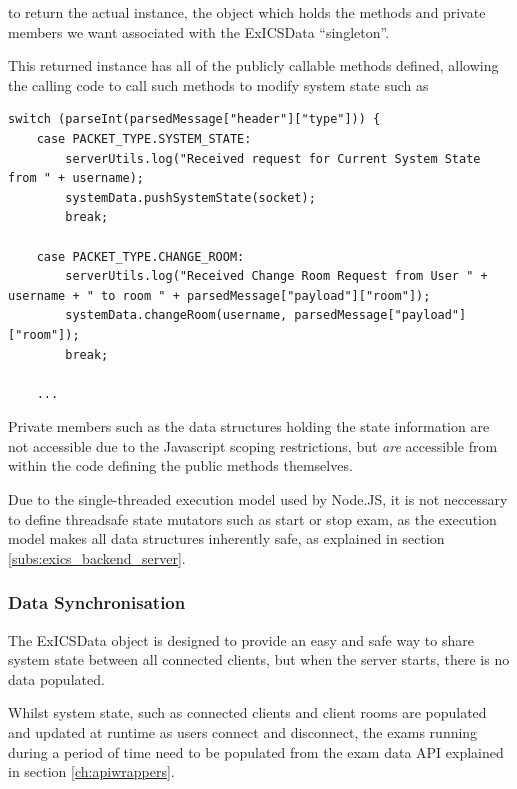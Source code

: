 \FloatBarrier

to return the actual instance, the object which holds the methods and private members we want associated with the ExICSData ``singleton''.

This returned instance has all of the publicly callable methods defined, allowing the calling code to call such methods to modify system state such as

\FloatBarrier

\lstset{language=JavaScript}
\begin{lstlisting}[tabsize=2,
		breaklines=true]
switch (parseInt(parsedMessage["header"]["type"])) {
	case PACKET_TYPE.SYSTEM_STATE:
		serverUtils.log("Received request for Current System State from " + username);
		systemData.pushSystemState(socket);
		break;

	case PACKET_TYPE.CHANGE_ROOM:
		serverUtils.log("Received Change Room Request from User " + username + " to room " + parsedMessage["payload"]["room"]);
		systemData.changeRoom(username, parsedMessage["payload"]["room"]);
		break;

	...
\end{lstlisting}

\FloatBarrier

Private members such as the data structures holding the state information are not accessible due to the Javascript scoping restrictions, but \textit{are} accessible from within the code defining the public methods themselves.

Due to the single-threaded execution model used by Node.JS, it is not neccessary to define threadsafe state mutators such as start or stop exam, as the execution model makes all data structures inherently safe, as explained in section \ref{subs:exics_backend_server}.

\subsubsection{Data Synchronisation}

The ExICSData object is designed to provide an easy and safe way to share system state between all connected clients, but when the server starts, there is no data populated.

Whilst system state, such as connected clients and client rooms are populated and updated at runtime as users connect and disconnect, the exams running during a period of time need to be populated from the exam data API explained in section \ref{ch:apiwrappers}.

